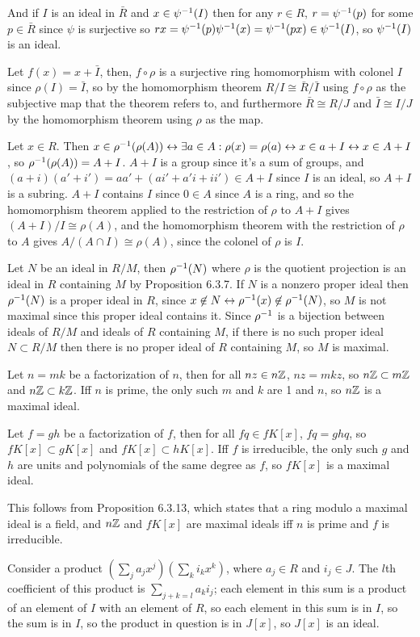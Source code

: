 \documentclass[11pt, oneside]{article}   	%
\begin{document}
And if $I$ is an ideal in $\bar{R}$ and $x \in \psi^{-1}(I)$ then for any $r \in R$, $r = \psi^{-1}(p)$ for some $p \in \bar{R}$ since $\psi$ is surjective so $rx = \psi^{-1}(p)\psi^{-1}(x) = \psi^{-1}(px) \in \psi^{-1}(I)$, so $\psi^{-1}(I)$ is an ideal.
\item Let $f(x) = x + \bar{I}$, then, $f \circ \rho$ is a surjective ring homomorphism with colonel $I$ since $\rho(I) = \bar{I}$, so by the homomorphism theorem $R / I \cong \bar{R} / \bar{I}$ using $f \circ \rho$ as the subjective map that the theorem refers to, and furthermore $\bar{R} \cong R / J$ and $\bar{I} \cong I  /J$ by the homomorphism theorem using $\rho$ as the map.
\item Let $x \in R$. Then $x \in \rho^{-1}(\rho(A)) \leftrightarrow \exists a \in A:\rho(x) = \rho(a) \leftrightarrow x \in a + I \leftrightarrow x \in A + I$, so $\rho^{-1}(\rho(A)) = A + I$. $A+I$ is a group since it's a sum of groups, and $(a + i)(a' + i') = aa' + (ai' + a'i + ii') \in A + I$ since $I$ is an ideal, so $A + I$ is a subring. $A + I$ contains $I$ since $0 \in A$ since $A$ is a ring, and so the homomorphism theorem applied to the restriction of $\rho$ to $A+I$ gives $(A+I)/I \cong \rho(A)$, and the homomorphism theorem with the restriction of $\rho$ to $A$ gives $A / (A \cap I) \cong \rho(A)$, since the colonel of $\rho$ is $I$. 
\item Let $N$ be an ideal in $R/M$, then $\rho^{-1}(N)$ where $\rho$ is the quotient projection is an ideal in $R$ containing $M$ by Proposition 6.3.7. If $N$ is a nonzero proper ideal then $\rho^{-1}(N)$ is a proper ideal in $R$, since $x \not \in N \leftrightarrow \rho^{-1}(x) \not \in \rho^{-1}(N)$, so $M$ is not maximal since this proper ideal contains it. Since $\rho^{-1}$ is a bijection between ideals of $R/M$ and ideals of $R$ containing $M$, if there is no such proper ideal $N\subset R/M$ then there is no proper ideal of $R$ containing $M$, so $M$ is maximal.
\item \be
\item Let $n=mk$ be a factorization of $n$, then for all $nz \in n\mathbb{Z}$, $nz = mkz$, so $n\mathbb{Z} \subset m\mathbb{Z}$ and $n\mathbb{Z} \subset k\mathbb{Z}$. Iff $n$ is prime, the only such $m$ and $k$ are 1 and $n$, so $n\mathbb{Z}$ is a maximal ideal.
\item Let $f = gh$ be a factorization of $f$, then for all $fq \in fK[x]$, $fq = ghq$, so $fK[x] \subset gK[x]$ and $fK[x] \subset hK[x]$. Iff $f$ is irreducible, the only such $g$ and $h$ are units and polynomials of the same degree as $f$, so $fK[x]$ is a maximal ideal.
\item This follows from Proposition 6.3.13, which states that a ring modulo a maximal ideal is a field, and $n\mathbb{Z}$ and $fK[x]$ are maximal ideals iff $n$ is prime and $f$ is irreducible.
\ee
\item Consider a product $(\sum_j a_jx^j)(\sum_k i_kx^k)$, where $a_j \in R$ and $i_j \in J$. The $l$th coefficient of this product is $\sum_{j+k = l}a_ki_j$; each element in this sum is a product of an element of $I$ with an element of $R$, so each element in this sum is in $I$, so the sum is in $I$, so the product in question is in $J[x]$, so $J[x]$ is an ideal. 
\end{document}
